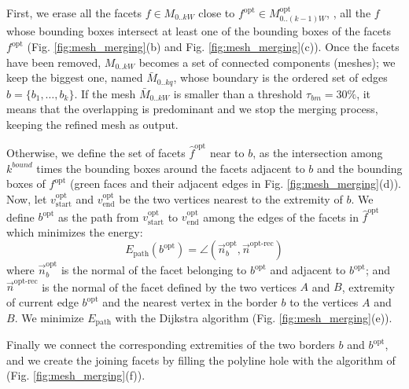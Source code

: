 First, we erase all the facets  $f \in \mathit{M}_{0..kW}$ close to $f^{\text{opt}} \in \mathit{M}_{0..(k-1)W}^{\text{opt}}$, \ie, all the $f$ whose bounding boxes intersect at least one of the bounding boxes of the facets $f^{\text{opt}}$ (Fig. \ref{fig:mesh_merging}(b) and Fig. \ref{fig:mesh_merging}(c)).
Once the facets have been removed, $\mathit{M}_{0..kW}$ becomes a set of connected components (meshes); we keep the biggest one, named $\mathit{\bar{M}}_{0..kq}$, whose boundary is the ordered set of edges $\mathit{b} = \{b_1, \dots,  b_k\}$.
If the mesh $\mathit{\bar{M}}_{0..kW}$ is smaller than a threshold $\tau_{bm}=30\%$, it means that the overlapping is predominant and we stop the merging process, keeping the refined mesh as output.

Otherwise, we define the set of facets $\hat{f}^{\text{opt}}$ near to $\mathit{b}$, as the intersection among  $k^{bound}$ times the bounding boxes around the facets adjacent to  $\mathit{b}$ and the bounding boxes of $f^{\text{opt}}$  (green faces and their adjacent edges in Fig. \ref{fig:mesh_merging}(d)).
Now, let  $v_{\text{start}}^{\text{opt}}$ and $v_{\text{end}}^{\text{opt}}$ be the two vertices nearest to the extremity of  $\mathit{b}$. 
We define $\mathit{b}^{\text{opt}}$ as the path from $v_{\text{start}}^{\text{opt}}$ to $v_{\text{end}}^{\text{opt}}$ among the edges of the facets in $\hat{f}^{\text{opt}}$ which minimizes the energy:
\begin{equation}
  E_{\text{path}}(b^{\text{opt}}) = \angle (\overrightarrow{n}_b^{\text{opt}},\overrightarrow{n}^{\text{opt-rec}})
\end{equation}
where $\overrightarrow{n}_b^{\text{opt}}$ is the normal of the facet belonging to $\mathit{b}^{\text{opt}}$ and adjacent to  $b^{\text{opt}}$; and
$\overrightarrow{n}^{\text{opt-rec}}$ is the normal of the facet defined by the two vertices $A$ and $B$, extremity of current edge ${b}^{\text{opt}}$ and the nearest vertex in the border $\mathit{b}$ to the vertices $A$ and $B$.
We minimize $E_{\text{path}}$ with the Dijkstra algorithm  (Fig. \ref{fig:mesh_merging}(e)).

Finally we connect the corresponding extremities of the two borders $\mathit{b}$ and $\mathit{b}^{\text{opt}}$, and we create the joining facets by filling the polyline hole with the algorithm of \cite{liepa2003filling}  (Fig. \ref{fig:mesh_merging}(f)).

